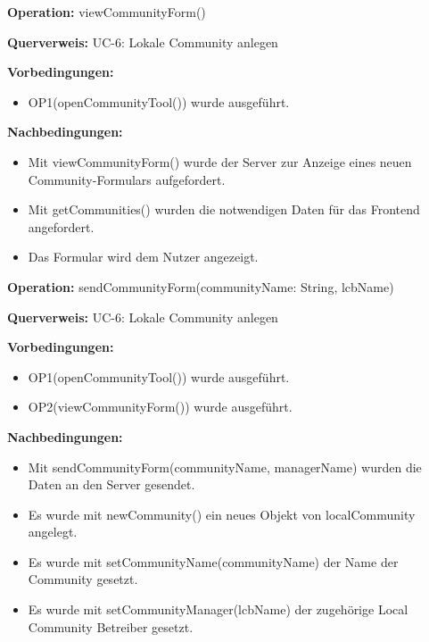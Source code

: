 \documentclass[a4paper,12pt]{article}
\begin{document}
	\begin{contractbox}
		\textbf{Operation:} viewCommunityForm()
		
			\textbf{Querverweis:} UC-6: Lokale Community anlegen
		
		\textbf{Vorbedingungen:}
		\begin{itemize}[noitemsep]
			\item OP1(openCommunityTool()) wurde ausgeführt.
		\end{itemize}
		
		\textbf{Nachbedingungen:}
		\begin{itemize}[noitemsep]
			\item Mit viewCommunityForm() wurde der Server zur Anzeige eines neuen Community-Formulars aufgefordert.
			\item Mit getCommunities() wurden die notwendigen Daten für das Frontend angefordert.
			\item Das Formular wird dem Nutzer angezeigt.
		\end{itemize}
	\end{contractbox}

	\begin{contractbox}
		\textbf{Operation:} sendCommunityForm(communityName: String, lcbName)
		
			\textbf{Querverweis:} UC-6: Lokale Community anlegen
		
		\textbf{Vorbedingungen:}
		\begin{itemize}[noitemsep]
			\item OP1(openCommunityTool()) wurde ausgeführt.
			\item OP2(viewCommunityForm()) wurde ausgeführt.
		\end{itemize}
		
		\textbf{Nachbedingungen:}
		\begin{itemize}[noitemsep]
			\item Mit sendCommunityForm(communityName, managerName) wurden die Daten an den Server gesendet.
			\item Es wurde mit newCommunity() ein neues Objekt von localCommunity angelegt.
			\item Es wurde mit setCommunityName(communityName) der Name der Community gesetzt.
			\item Es wurde mit setCommunityManager(lcbName) der zugehörige Local Community Betreiber gesetzt.
		\end{itemize}
	\end{contractbox}
\end{document}
